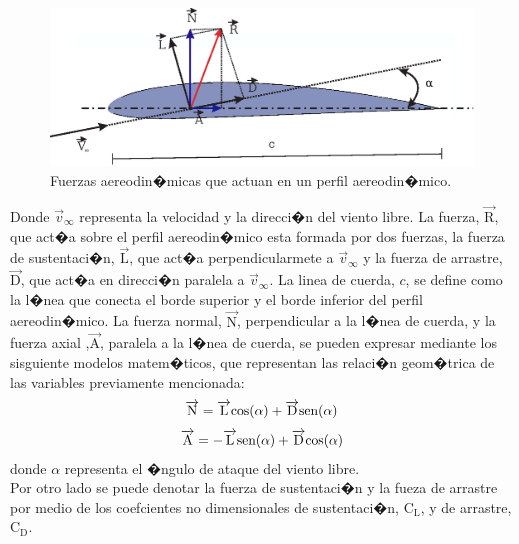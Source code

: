 \documentclass[10pt,a4paper]{book}
\begin{document}
\begin{figure}[H]
\begin{center}
\includegraphics[scale=0.80]{Imagenes/Cuchilla.eps}  
\caption{Fuerzas aereodin�micas que actuan en un perfil aereodin�mico.}
\label{FuerzasCuchilla}
\end{center}
\end{figure}
Donde $\overrightarrow{v}_{\infty}$ representa la velocidad y la direcci�n del viento libre. La fuerza, $\overrightarrow{\text{R}}$, que act�a sobre el perfil aereodin�mico esta formada por dos fuerzas, la fuerza de sustentaci�n, $\overrightarrow{\text{L}}$, que act�a perpendicularmete a $\overrightarrow{v}_{\infty}$ y la fuerza de arrastre, $\overrightarrow{\text{D}}$, que act�a en direcci�n paralela a $\overrightarrow{v}_{\infty}$. La linea de cuerda, $c$, se define como la l�nea que conecta el borde superior y el borde inferior del perfil aereodin�mico. La fuerza normal, $\overrightarrow{\text{N}}$, perpendicular a la l�nea de cuerda, y la fuerza axial ,$\overrightarrow{\text{A}}$, paralela a la l�nea de cuerda, se pueden expresar mediante los sisguiente modelos matem�ticos, que representan las relaci�n geom�trica de las variables previamente mencionada: 
\begin{align}
\notag
\overrightarrow{\text{N}} = \overrightarrow{\text{L}}\text{cos}( \alpha) + \overrightarrow{\text{D}}\text{sen}( \alpha ) 
\end{align} 
\begin{align}
\notag
\overrightarrow{\text{A}} = - \overrightarrow{\text{L}}\text{sen}( \alpha )  + \overrightarrow{\text{D}}\text{cos}( \alpha )
\end{align} 
donde $\alpha$ representa el �ngulo de ataque del viento libre.\\

Por otro lado se puede denotar la fuerza de sustentaci�n y la fueza de arrastre por medio de los coefcientes no dimensionales de sustentaci�n, $\text{C}_{\text{L}}$, y de arrastre, $\text{C}_{\text{D}}$. 
\end{document}
